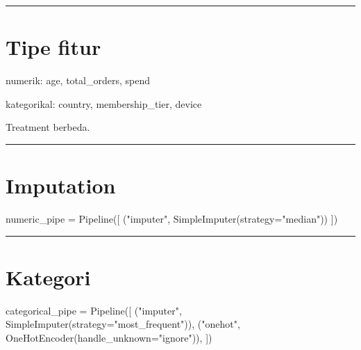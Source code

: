 \documentclass[
  indonesian,
  letterpaper,
  DIV=11,
  numbers=noendperiod]{scrreprt}
\newenvironment{Shaded}{\begin{snugshade}}{\end{snugshade}}
\newcommand{\NormalTok}[1]{\textcolor[rgb]{0.00,0.23,0.31}{#1}}
\newcommand{\OperatorTok}[1]{\textcolor[rgb]{0.37,0.37,0.37}{#1}}
\newcommand{\StringTok}[1]{\textcolor[rgb]{0.13,0.47,0.30}{#1}}
\begin{document}
\begin{center}\rule{0.5\linewidth}{0.5pt}\end{center}

\section{Tipe fitur}\label{tipe-fitur}

\begin{Shaded}
\begin{Highlighting}[]
\NormalTok{numerik:}
\NormalTok{  age, total\_orders, spend}

\NormalTok{kategorikal:}
\NormalTok{  country, membership\_tier, device}
\end{Highlighting}
\end{Shaded}

Treatment berbeda.

\begin{center}\rule{0.5\linewidth}{0.5pt}\end{center}

\section{Imputation}\label{imputation}

\begin{Shaded}
\begin{Highlighting}[]
\NormalTok{numeric\_pipe }\OperatorTok{=}\NormalTok{ Pipeline([}
\NormalTok{    (}\StringTok{"imputer"}\NormalTok{, SimpleImputer(strategy}\OperatorTok{=}\StringTok{"median"}\NormalTok{))}
\NormalTok{])}
\end{Highlighting}
\end{Shaded}

\begin{center}\rule{0.5\linewidth}{0.5pt}\end{center}

\section{Kategori}\label{kategori}

\begin{Shaded}
\begin{Highlighting}[]
\NormalTok{categorical\_pipe }\OperatorTok{=}\NormalTok{ Pipeline([}
\NormalTok{    (}\StringTok{"imputer"}\NormalTok{, SimpleImputer(strategy}\OperatorTok{=}\StringTok{"most\_frequent"}\NormalTok{)),}
\NormalTok{    (}\StringTok{"onehot"}\NormalTok{, OneHotEncoder(handle\_unknown}\OperatorTok{=}\StringTok{"ignore"}\NormalTok{)),}
\NormalTok{])}
\end{Highlighting}
\end{Shaded}
\end{document}
